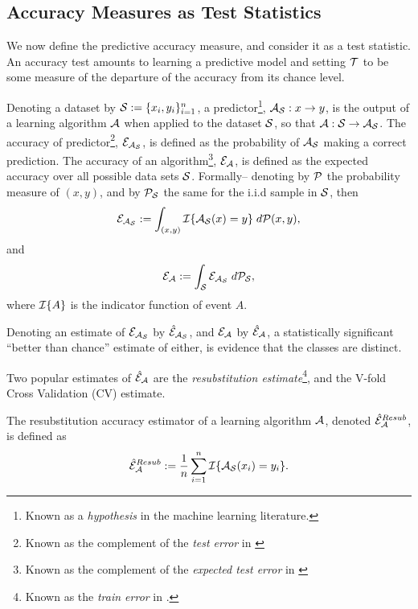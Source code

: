 \documentclass[12pt,a4paper]{article}
\begin{document}
\subsection{Accuracy Measures as Test Statistics}
We now define the predictive accuracy measure, and consider it as a test statistic.
An accuracy test amounts to learning a predictive model and setting $\mathcal{T}$ to be some measure of the departure of the accuracy from its chance level.  

Denoting a dataset by $\mathcal{S}:=\{x_i,y_i\}_{i=1}^n$, a predictor\footnote{Known as a \emph{hypothesis} in the machine learning literature.}, $\mathcal{A}_{\mathcal{S}}:x \to y$, is the output of a learning algorithm $\mathcal{A}$ when applied to the dataset $\mathcal{S}$, so that $\mathcal{A}:\mathcal{S} \to \mathcal{A}_{\mathcal{S}}$. 
The accuracy of predictor\footnote{Known as the complement of the \emph{test error} in \cite{hastie_elements_2003}}, $\mathcal{E}_{\mathcal{A}_{\mathcal{S}}}$, is defined as the probability of $\mathcal{A}_{\mathcal{S}}$ making a correct prediction. 
The accuracy of an algorithm\footnote{Known as the complement of the \emph{expected test error} in \cite{hastie_elements_2003}}, $\mathcal{E}_{\mathcal{A}}$, is defined as the expected accuracy over all possible data sets $\mathcal{S}$. 
Formally-- denoting by $\mathcal{P}$ the probability measure of $(x, y)$, and by $\mathcal{P}_{\mathcal{S}}$ the same for the i.i.d sample in $\mathcal{S}$, then
\begin{align}
	\mathcal{E}_{\mathcal{A}_{\mathcal{S}}}:=\int_{(x,y)} \mathcal{I}{\{ \mathcal{A}_{\mathcal{S}}(x)=y \}} \; d\mathcal{P}(x,y),
\end{align}
and
\begin{align}
	\mathcal{E}_{\mathcal{A}}:=\int_{\mathcal{S}} \mathcal{E}_{\mathcal{A}_{\mathcal{S}}} \; d\mathcal{P}_{\mathcal{S}},
\end{align}
where $\mathcal{I}{\{ A \}}$ is the indicator function of event $A$. 

Denoting an estimate of $\mathcal{E}_{\mathcal{A}_{\mathcal{S}}}$ by $\hat{\mathcal{E}}_{\mathcal{A}_{\mathcal{S}}}$, and $\mathcal{E}_{\mathcal{A}}$ by $\hat{\mathcal{E}}_{\mathcal{A}}$, a statistically significant ``better than chance'' estimate of either, is evidence that the classes are distinct. 

Two popular estimates of $\hat{\mathcal{E}}_{\mathcal{A}}$ are the \emph{resubstitution estimate}\footnote{Known as the \emph{train error} in \cite{hastie_elements_2003}.}, and the V-fold Cross Validation (CV) estimate.
\begin{definition}
\label{def:resubstitution}
The resubstitution accuracy estimator of a learning algorithm $\mathcal{A}$, denoted $\hat{\mathcal{E}}_{\mathcal{A}}^{Resub}$,  is defined as
\begin{align}
	\hat{\mathcal{E}}_{\mathcal{A}}^{Resub} := \frac 1n \sum_{i=1}^{n} \mathcal{I}{\{ \mathcal{A}_{\mathcal{S}}(x_i)=y_i \}}.
\end{align}
\end{definition}
\end{document}
